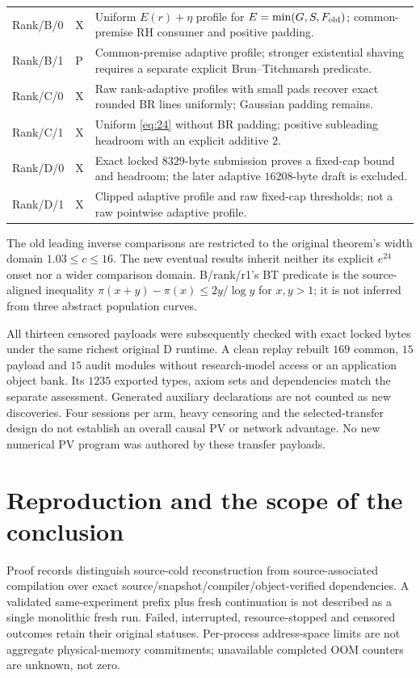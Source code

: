 \documentclass[11pt]{article}
\begin{document}
\begin{longtable}{@{}>{\raggedright\arraybackslash}p{.17\linewidth}>{\raggedright\arraybackslash}p{.10\linewidth}>{\raggedright\arraybackslash}p{.66\linewidth}@{}}
Rank/B/0&X&Uniform \(E(r)+\eta\) profile for \(E=\min(G,S,F_{\rm old})\);
common-premise RH consumer and positive padding.\\
Rank/B/1&P&Common-premise adaptive profile; stronger existential shaving
requires a separate explicit Brun--Titchmarsh predicate.\\
Rank/C/0&X&Raw rank-adaptive profiles with small pads recover exact rounded
BR lines uniformly; Gaussian padding remains.\\
Rank/C/1&X&Uniform \eqref{eq:24} without BR padding; positive subleading headroom
with an explicit additive \(2\).\\
Rank/D/0&X&Exact locked \(8329\)-byte submission proves a fixed-cap bound and
headroom; the later adaptive \(16208\)-byte draft is excluded.\\
Rank/D/1&X&Clipped adaptive profile and raw fixed-cap thresholds;
not a raw pointwise adaptive profile.\\
\bottomrule
\end{longtable}
\normalsize

The old leading inverse comparisons are restricted to the original theorem's
width domain \(1.03\le c\le16\). The new eventual results inherit neither its
explicit \(e^{24}\) onset nor a wider comparison domain. B/rank/r1's BT
predicate is the source-aligned inequality
\(\pi(x+y)-\pi(x)\le2y/\log y\) for \(x,y>1\); it is not inferred from three
abstract population curves.

All thirteen censored payloads were subsequently checked with exact locked
bytes under the same richest original D runtime. A clean replay rebuilt
\(169\) common, \(15\) payload and \(15\) audit modules without research-model
access or an application object bank. Its \(1235\) exported types, axiom sets
and dependencies match the separate assessment. Generated auxiliary
declarations are not counted as new discoveries. Four sessions per arm,
heavy censoring and the selected-transfer design do not establish an overall
causal PV or network advantage. No new numerical PV program was authored by
these transfer payloads.

\section{Reproduction and the scope of the conclusion}
Proof records distinguish source-cold reconstruction from source-associated
compilation over exact source/snapshot/compiler/object-verified dependencies.
A validated same-experiment prefix plus fresh continuation is not described
as a single monolithic fresh run. Failed, interrupted, resource-stopped and
censored outcomes retain their original statuses. Per-process address-space
limits are not aggregate physical-memory commitments; unavailable completed
OOM counters are unknown, not zero.
\end{document}
